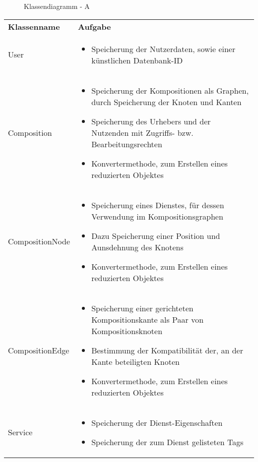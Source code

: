 \begin{figure}[h]
	\centering
	\caption{Klassendiagramm - A}
	\label{fig:klassendiagramm-a}
\end{figure}

\begin{table}[h]
	\centering	
	\begin{tabularx}{\textwidth}{X X}
		\rowcolor[HTML]{C0C0C0} 
		\textbf{Klassenname} & \textbf{Aufgabe} \\
		User & \begin{itemize}
			\item Speicherung der Nutzerdaten, sowie einer künstlichen Datenbank-ID
		\end{itemize}\\
		\rowcolor[HTML]{E7E7E7} 
		Composition & \begin{itemize}
			\item Speicherung der Kompositionen als Graphen, durch Speicherung der Knoten und Kanten
			\item Speicherung des Urhebers und der Nutzenden mit Zugriffs- bzw. Bearbeitungsrechten 
			\item Konvertermethode, zum Erstellen eines reduzierten Objektes
		\end{itemize} \\
		CompositionNode & \begin{itemize}
			\item Speicherung eines Dienstes, für dessen Verwendung im Kompositionsgraphen
			\item Dazu Speicherung einer Position und Aunsdehnung des Knotens
			\item Konvertermethode, zum Erstellen eines reduzierten Objektes
		\end{itemize} \\
		\rowcolor[HTML]{E7E7E7} 
		CompositionEdge & \begin{itemize}
			\item Speicherung einer gerichteten Kompositionskante als Paar von Kompositionsknoten
			\item Bestimmung der Kompatibilität der, an der Kante beteiligten Knoten
			\item Konvertermethode, zum Erstellen eines reduzierten Objektes
		\end{itemize} \\
		Service & \begin{itemize}
			\item Speicherung der Dienst-Eigenschaften 
			\item Speicherung der zum Dienst gelisteten Tags

\end{itemize}
\end{tabularx}
\end{table}
